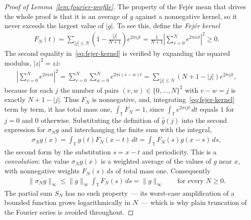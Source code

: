 \begin{proof}[Proof of Lemma~\ref{lem:fourier-profile}]
The property of the Fej\'er mean that drives the whole proof is that it is an average of $g$ against a nonnegative kernel, so it never exceeds the largest value of $|g|$. To see this, define the \emph{Fej\'er kernel}
\begin{align}
F_N(t)=\sum_{|j|\leq N}\left(1-\frac{|j|}{N+1}\right)e^{2\pi ijt}
=\frac1{N+1}\left|\sum_{v=0}^Ne^{2\pi ivt}\right|^2\geq0.
\label{eq:fejer-kernel}
\end{align}
The second equality in~\eqref{eq:fejer-kernel} is verified by expanding the squared modulus, $|z|^2=z\bar z$:
\begin{align*}
\left|\sum_{v=0}^Ne^{2\pi ivt}\right|^2
=\sum_{v=0}^N\sum_{w=0}^Ne^{2\pi i(v-w)t}
=\sum_{|j|\leq N}(N+1-|j|)e^{2\pi ijt},
\end{align*}
because for each $j$ the number of pairs $(v,w)\in\{0,\ldots,N\}^2$ with $v-w=j$ is exactly $N+1-|j|$. Thus $F_N$ is nonnegative, and, integrating~\eqref{eq:fejer-kernel} term by term, it has total mass one, $\int_{\mathbb T}F_N=1$, since $\int_{\mathbb T}e^{2\pi ijt}\,dt$ equals $1$ for $j=0$ and $0$ otherwise. Substituting the definition of $\hat g(j)$ into the second expression for $\sigma_Ng$ and interchanging the finite sum with the integral,
\begin{align*}
\sigma_Ng(x)
=\int_{\mathbb T}g(t)F_N(x-t)\,dt
=\int_{\mathbb T}F_N(s)g(x-s)\,ds,
\end{align*}
the second form by the substitution $s=x-t$ and periodicity. This is a \emph{convolution}: the value $\sigma_Ng(x)$ is a weighted average of the values of $g$ near $x$, with nonnegative weights $F_N(s)\,ds$ of total mass one. Consequently
\begin{align}
\|\sigma_Ng\|_\infty
\leq\|g\|_\infty\int_{\mathbb T}F_N(s)\,ds
=\|g\|_\infty
\qquad\text{for every }N\geq0.
\label{eq:fejer-stable}
\end{align}
The partial sum $S_N$ has no such property~--- its worst-case amplification of a bounded function grows logarithmically in $N$~--- which is why plain truncation of the Fourier series is avoided throughout.


\end{proof}
